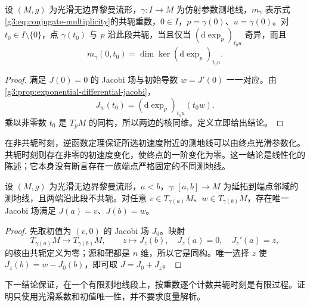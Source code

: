 \begin{proposition}\label{g3:prop:conjugate-exp-singularity}
	设 \((M,g)\) 为光滑无边界黎曼流形，\(\gamma:I\to M\) 为仿射参数测地线，\(m_\gamma\) 表示式\eqref{g3:eq:conjugate-multiplicity}的共轭重数，\(0\in I\)，\(p=\gamma(0)\)、\(u=\dot\gamma(0)\)。对 \(t_0\in I\setminus\{0\}\)，点 \(\gamma(t_0)\) 与 \(p\) 沿此段共轭，当且仅当 \((\mathrm d\exp_p)_{t_0u}\) 奇异，而且
	\begin{equation}\label{g3:eq:conjugate-exp-nullity}
		m_\gamma(0,t_0)=\dim\ker(\mathrm d\exp_p)_{t_0u}.
	\end{equation}
\end{proposition}
\begin{proof}
	满足 \(J(0)=0\) 的 Jacobi 场与初始导数 \(w=J'(0)\) 一一对应。由\cref{g3:prop:exponential-differential-jacobi}，
	\[
		J_w(t_0)=(\mathrm d\exp_p)_{t_0u}(t_0w).
	\]
	乘以非零数 \(t_0\) 是 \(T_pM\) 的同构，所以两边的核同维。定义立即给出结论。
\end{proof}

在非共轭时刻，逆函数定理保证所选初速度附近的测地线可以由终点光滑参数化。共轭时刻则存在非零的初速度变化，使终点的一阶变化为零。这一结论是线性化的陈述；它本身没有断言存在一族端点严格固定的不同测地线。

\begin{corollary}\label{g3:cor:jacobi-boundary-value}
	设 \((M,g)\) 为光滑无边界黎曼流形，\(a<b\)，\(\gamma:[a,b]\to M\) 为延拓到端点邻域的测地线，且两端沿此段不共轭。对任意 \(v\in T_{\gamma(a)}M\)、\(w\in T_{\gamma(b)}M\)，存在唯一 Jacobi 场满足 \(J(a)=v\)、\(J(b)=w\)。
\end{corollary}
\begin{proof}
	先取初值为 \((v,0)\) 的 Jacobi 场 \(J_0\)。映射
	\[
		T_{\gamma(a)}M\longrightarrow T_{\gamma(b)}M,
		\qquad z\longmapsto J_z(b),\quad
		J_z(a)=0,\quad J_z'(a)=z,
	\]
	的核由共轭定义为零；源和靶都是 \(n\) 维，所以它是同构。唯一选择 \(z\) 使 \(J_z(b)=w-J_0(b)\)，即可取 \(J=J_0+J_z\)。
\end{proof}

下一结论保证，在一个有限测地线段上，按重数逐个计数共轭时刻是有限过程。证明只使用光滑系数和初值唯一性，并不要求度量解析。


